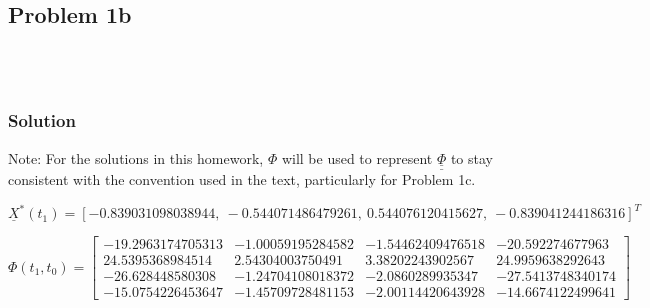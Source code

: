 \documentclass[conf]{new-aiaa}
\begin{document}
\subsection*{Problem 1b} 

\begin{center}
	 \\
	 \\
\end{center}


\subsubsection*{Solution} 

Note: For the solutions in this homework, $\Phi$ will be used to represent $\underline{\underline{\Phi}}$ to stay consistent with the convention used in the text, particularly for Problem 1c. 

\begin{equation}
	\underline{X}^*(t_{1}) = [         -0.839031098038944,~
	-0.544071486479261,~
	0.544076120415627,~
	-0.839041244186316 ]^T
\end{equation}

\begin{equation}
	\Phi(t_{1}, t_0) = 
	\begin{bmatrix}
         -19.2963174705313    &     -1.00059195284582    &     -1.54462409476518   &       -20.592274677963 \\
		24.5395368984514      &    2.54304003750491      &    3.38202243902567     &     24.9959638292643 \\
		-26.628448580308      &   -1.24704108018372      &    -2.0860289935347     &    -27.5413748340174 \\
		-15.0754226453647     &    -1.45709728481153     &    -2.00114420643928    &     -14.6674122499641
	\end{bmatrix}
\end{equation}
\end{document}
